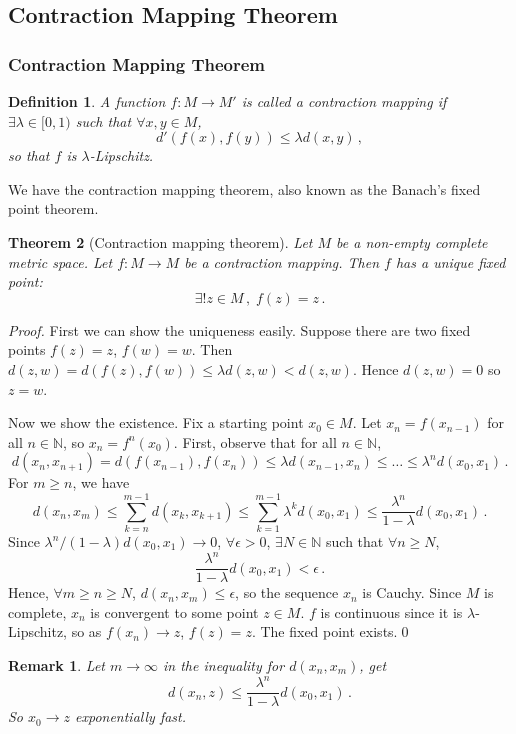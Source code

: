 \documentclass{article}
\theoremstyle{plain}\theoremheaderfont{\normalfont\itshape}\theorembodyfont{\rmfamily}\theoremseparator{.}\newtheorem*{rem}{Remark}\newtheorem*{ex}{Example}\newtheorem*{proof}{Proof}\newtheorem*{altp}{Alternative proof}
\theoremstyle{plain}\theoremheaderfont{\normalfont\bfseries}\theorembodyfont{\rmfamily}\theoremseparator{.}\newtheorem{thm}{Theorem}[section]\newtheorem{lem}[thm]{Lemma}\newtheorem{prop}[thm]{Proposition}\newtheorem*{cor}{Corollary}\newtheorem{defn}[thm]{Definition}\newtheorem{clm}[thm]{Claim}\newtheorem{clminproof}{Claim}
\theoremstyle{break}\theoremheaderfont{\normalfont\itshape}\theorembodyfont{\rmfamily}\theoremseparator{.\medskip}\newtheorem*{proofskip}{Proof}\newtheorem*{exs}{Examples}\newtheorem*{rems}{Remarks}
\theoremstyle{break}\theoremheaderfont{\normalfont\bfseries}\theorembodyfont{\rmfamily}\theoremseparator{.\medskip}\newtheorem{lemskip}[thm]{Lemma}\newtheorem{defnskip}[thm]{Definition}\newtheorem{propskip}[thm]{Proposition}\newtheorem{thmskip}[thm]{Theorem}
\newcommand{\qed}{\hfill\ensuremath{\Box}}
\begin{document}
    \subsection{Contraction Mapping Theorem}
    \subsubsection{Contraction Mapping Theorem}
    \begin{defn}
        A function \(f:M\to M'\) is called a \textit{contraction mapping} if \(\exists \lambda\in[0,1)\) such that \(\forall x,y\in M\),
        \[d'(f(x),f(y))\le\lambda d(x,y)\,,\]
        so that \(f\) is \(\lambda\)-Lipschitz.
    \end{defn}

    We have the contraction mapping theorem, also known as the Banach's fixed point theorem.
    \begin{thm}[Contraction mapping theorem]
        Let \(M\) be a non-empty complete metric space. Let \(f:M\to M\) be a contraction mapping. Then \(f\) has a unique fixed point:
        \[\exists ! z\in M\,,\;f(z)=z\,.\]
    \end{thm}
    \begin{proof}
        First we can show the uniqueness easily. Suppose there are two fixed points \(f(z)=z\), \(f(w)=w\). Then \(d(z,w)=d(f(z),f(w))\le\lambda d(z,w)<d(z,w)\). Hence \(d(z,w)=0\) so \(z=w\).

        Now we show the existence. Fix a starting point \(x_0\in M\). Let \(x_n=f(x_{n-1})\) for all \(n\in\mathbb{N}\), so \(x_n=f^n(x_0)\). First, observe that for all \(n\in\mathbb{N}\),
        \[d(x_n,x_{n+1})=d(f(x_{n-1}),f(x_n))\le\lambda d(x_{n-1},x_n)\le\dots\le\lambda^n d(x_0,x_1)\,.\]
        For \(m\ge n\), we have
        \[d(x_n,x_m)\le\sum_{k=n}^{m-1}d(x_k,x_{k+1})\le\sum_{k=1}^{m-1}\lambda^k d(x_0,x_1)\le\frac{\lambda^n}{1-\lambda}d(x_0,x_1)\,.\]
        Since \(\lambda^n/(1-\lambda) d(x_0,x_1)\to 0\), \(\forall\epsilon>0\), \(\exists N\in\mathbb{N}\) such that \(\forall n\ge N\),
        \[\frac{\lambda^n}{1-\lambda}d(x_0,x_1)<\epsilon\,.\]
        Hence, \(\forall m\ge n\ge N\), \(d(x_n,x_m)\le\epsilon\), so the sequence \(x_n\) is Cauchy. Since \(M\) is complete, \(x_n\) is convergent to some point \(z\in M\). \(f\) is continuous since it is \(\lambda\)-Lipschitz, so as \(f(x_n)\to z\), \(f(z)=z\). The fixed point exists.\qed
    \end{proof}
    \begin{rem}
        Let \(m\to\infty\) in the inequality for \(d(x_n,x_m)\), get
        \[d(x_n,z)\le\frac{\lambda^n}{1-\lambda}d(x_0,x_1)\,.\]
        So \(x_0\to z\) exponentially fast.
    \end{rem}
\end{document}
